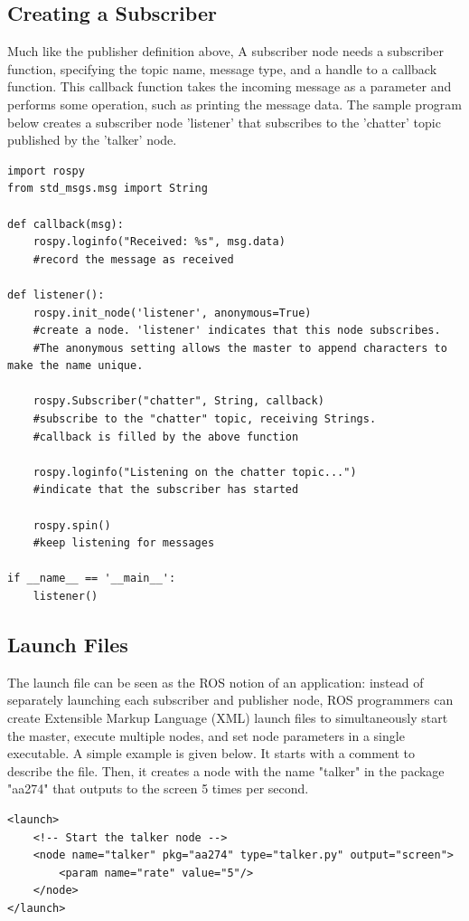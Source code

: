 \documentclass[twoside]{article}
\begin{document}
\subsection{Creating a Subscriber}
Much like the publisher definition above, A subscriber node needs a subscriber function, specifying the topic name, message type, and a handle to a callback function. This callback function takes the incoming message as a parameter and performs some operation, such as printing the message data. The sample program below creates a subscriber node 'listener' that subscribes to the 'chatter' topic published by the 'talker' node.
\begin{verbatim}
import rospy
from std_msgs.msg import String

def callback(msg):
    rospy.loginfo("Received: %s", msg.data)
    #record the message as received
    
def listener():
    rospy.init_node('listener', anonymous=True)
    #create a node. 'listener' indicates that this node subscribes.
    #The anonymous setting allows the master to append characters to make the name unique.
    
    rospy.Subscriber("chatter", String, callback)
    #subscribe to the "chatter" topic, receiving Strings. 
    #callback is filled by the above function
    
    rospy.loginfo("Listening on the chatter topic...")
    #indicate that the subscriber has started
    
    rospy.spin()
    #keep listening for messages
    
if __name__ == '__main__':
	listener()
\end{verbatim}

\subsection{Launch Files}
The launch file can be seen as the ROS notion of an application: instead of separately launching each subscriber and publisher node, ROS programmers can create Extensible Markup Language (XML) launch files to simultaneously start the master, execute multiple nodes, and set node parameters in a single executable. A simple example is given below. It starts with a comment to describe the file. Then, it creates a node with the name "talker" in the package "aa274" that outputs to the screen 5 times per second.
\begin{verbatim}
<launch>
    <!-- Start the talker node -->
    <node name="talker" pkg="aa274" type="talker.py" output="screen">
        <param name="rate" value="5"/>
    </node>
</launch>
\end{verbatim}
\end{document}
